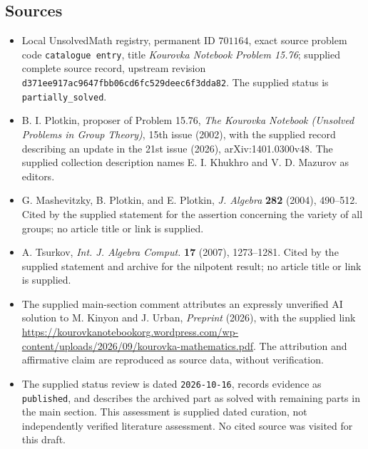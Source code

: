 \documentclass[11pt]{article}
\begin{document}
\subsection{Sources}
\begin{itemize}
\item Local UnsolvedMath registry, permanent ID \(701164\), exact source problem code \texttt{catalogue entry}, title \emph{Kourovka Notebook Problem 15.76}; supplied complete source record, upstream revision \texttt{d371ee917ac9647fbb06cd6fc529deec6f3dda82}. The supplied status is \texttt{partially\_solved}.
\item B. I. Plotkin, proposer of Problem 15.76, \emph{The Kourovka Notebook (Unsolved Problems in Group Theory)}, 15th issue (2002), with the supplied record describing an update in the 21st issue (2026), arXiv:1401.0300v48. The supplied collection description names E. I. Khukhro and V. D. Mazurov as editors.
\item G. Mashevitzky, B. Plotkin, and E. Plotkin, \emph{J. Algebra} \textbf{282} (2004), 490--512. Cited by the supplied statement for the assertion concerning the variety of all groups; no article title or link is supplied.
\item A. Tsurkov, \emph{Int. J. Algebra Comput.} \textbf{17} (2007), 1273--1281. Cited by the supplied statement and archive for the nilpotent result; no article title or link is supplied.
\item The supplied main-section comment attributes an expressly unverified AI solution to M. Kinyon and J. Urban, \emph{Preprint} (2026), with the supplied link \url{https://kourovkanotebookorg.wordpress.com/wp-content/uploads/2026/09/kourovka-mathematics.pdf}. The attribution and affirmative claim are reproduced as source data, without verification.
\item The supplied status review is dated \texttt{2026-10-16}, records evidence as \texttt{published}, and describes the archived part as solved with remaining parts in the main section. This assessment is supplied dated curation, not independently verified literature assessment. No cited source was visited for this draft.
\end{itemize}
\end{document}
